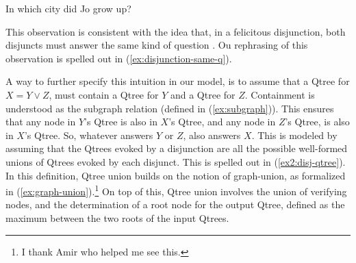 \begin{exe}
	 {In which city did Jo grow up?}
	\label{ex:city-disjunction}
\end{exe}

This observation is consistent with the idea that, in a felicitous disjunction, both disjuncts must answer the same kind of question \citep{Simons2001,Zhang2022}. Ou rephrasing of this observation is spelled out in (\ref{ex:disjunction-same-q}). 

\begin{exe}
	\label{ex:disjunction-same-q}
\end{exe}


A way to further specify this intuition in our model, is to assume that a Qtree for $X = Y \vee Z$, must contain a Qtree for $Y$ and a Qtree for $Z$. Containment is understood as the subgraph relation (defined in (\ref{ex:subgraph})). This ensures that any node in $Y$'s Qtree is also in $X$'s Qtree, and any node in $Z$'s Qtree, is also in $X$'s Qtree. So, whatever answers $Y$ or $Z$, also answers $X$. This is modeled by assuming that the Qtrees evoked by a disjunction are all the possible well-formed unions of Qtrees evoked by each disjunct. This is spelled out in (\ref{ex2:disj-qtree}). In this definition, Qtree union builds on the notion of graph-union, as formalized in (\ref{ex:graph-union}).\footnote{I thank Amir who helped me see this.} On top of this, Qtree union involves the union of verifying nodes, and the determination of a root node for the output Qtree, defined as the maximum between the two roots of the input Qtrees.



